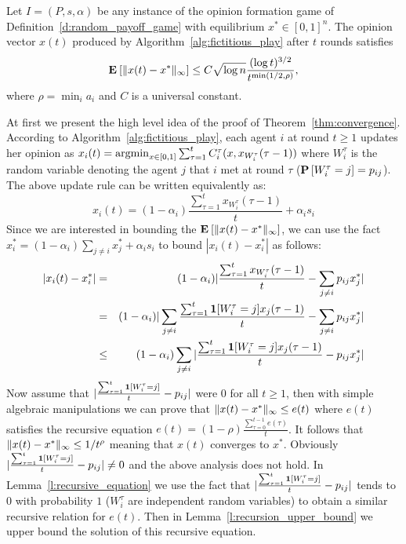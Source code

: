 \begin{theorem}\label{thm:convergence}
  Let $I = (P,s, \alpha)$ be any instance of the opinion formation
  game of Definition~\ref{d:random_payoff_game} with equilibrium
  $x^* \in [0,1]^n$.  The opinion vector $x(t)$ produced by
  Algorithm~\ref{alg:fictitious_play} after $t$ rounds satisfies
  \[
    \bm{\mathrm{E}}_{} \left[ \| x(t) - x^* \|_{\infty} \right] \leq
    C \sqrt{\log n}\frac{(\log t)^{3/2}}{t^{\min(1/2,\rho)}},
  \]
  where $\rho = \min_i a_i$ and $C$ is a universal constant.
\end{theorem}
\noindent At first we present the high level idea of the proof of Theorem~\ref{thm:convergence}.
According to Algorithm~\ref{alg:fictitious_play}, each agent $i$ at round $t\geq 1$ updates her opinion 
as $x_i(t)=\operatorname*{argmin}_{x \in [0,1]}\sum_{\tau=1}^tC^{\tau}_i(x,x_{W_i^{\tau}}(\tau-1))$
where $W_i^\tau$ is the random variable denoting the agent $j$ that $i$ met at round $\tau$ ($\bm{\mathrm{P}}\left[W_i^\tau=j\right]=p_{ij}$). 
The above update rule can be written equivalently as: \[x_i(t)=(1-\alpha_i)\frac{\sum_{\tau=1}^{t} x_{W_i^\tau}(\tau-1)}{t}+ \alpha_i s_i\]
Since we are interested in bounding the $\bm{\mathrm{E}}_{} \left[ \| x(t)-x^* \|_{\infty} \right]$, we 
can use the fact $x_i^*= (1-\alpha_i)\sum_{j \neq i}x_j^* + \alpha_is_i$ to bound $|x_i(t)-x_i^*|$ as follows: 
\begin{eqnarray*}
 |x_i(t)-x_i^*| &=& (1-\alpha_i)|\frac{\sum_{\tau=1}^{t} x_{W_i^\tau}(\tau-1)}{t}-\sum_{j\neq i} p_{ij}x_j^*|\\
 &=& (1-\alpha_i)|\sum_{j\neq i}\frac{\sum_{\tau=1}^{t} \bm{1}{\left[W_i^\tau=j\right]}x_j(\tau-1)}{t}-\sum_{j\neq i} p_{ij}x_j^*|\\
 &\leq& (1-\alpha_i)\sum_{j\neq i}|\frac{\sum_{\tau=1}^{t} \bm{1}{\left[W_i^\tau=j\right]}x_j(\tau-1)}{t}- p_{ij}x_j^*|
\end{eqnarray*}
Now assume that $|\frac{\sum_{\tau=1}^{t} \bm{1}{\left[W_i^{\tau}=j\right]}}{t}- p_{ij}|$ were $0$ for all $t\geq 1$, 
then with simple algebraic manipulations we can prove that $\| x(t)-x^* \|_{\infty} \leq e(t)$
where $e(t)$ satisfies the recursive equation $e(t) = (1-\rho)\frac{\sum_{\tau=0}^{t-1}e(\tau)}{t}$.
It follows that $\| x(t)-x^* \|_{\infty} \leq 1/t^\rho$ meaning that $x(t)$ converges to $x^*$.
Obviously $|\frac{\sum_{\tau=1}^{t} \bm{1}{\left[W_i^{\tau}=j\right]}}{t} - p_{ij}|\neq 0$ and 
the above analysis does not hold. In Lemma~\ref{l:recursive_equation} we use the 
fact that $|\frac{\sum_{\tau=1}^{t} \bm{1}{\left[W_i^{\tau}=j\right]}}{t} - p_{ij}|$ tends to $0$ with probability $1$
($W_i^{\tau}$ are independent random variables)
to obtain a similar recursive relation for $e(t)$. Then in Lemma~\ref{l:recursion_upper_bound} 
we upper bound the solution of this recursive equation.

